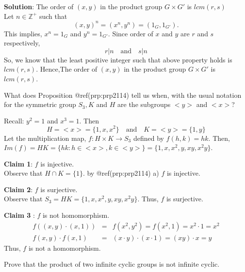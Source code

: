 \documentclass[
]{book}
\begin{document}
\textbf{Solution}: The order of \((x, y)\) in the product group
\(G \times G'\) is \(lcm(r,s)\)\\
Let \(n\in \mathbb{Z}^+\) such that \[(x,y)^n=(x^n,y^n)=(1_G,1_{G'}).\]
This implies, \(x^n=1_G\) and \(y^n=1_{G'}\). Since order of \(x\) and
\(y\) are \(r\) and \(s\) respectively, \[r|n~~~\text{ and }~~~s|n\] So,
we know that the least positive integer such that above property holds
is \(lcm(r,s)\). Hence,The order of \((x, y)\) in the product group
\(G \times G'\) is \(lcm(r,s)\).

\leavevmode{}%
What does Proposition @ref(prp:prp2114) tell us when, with the usual
notation for the symmetric group \(S_3,K\) and \(H\) are the subgroups
\(<y>\) and \(<x>\)?

Recall: \(y^2=1\) and \(x^3=1\). Then
\[H=<x>=\{1,x,x^2\}~~~\text{ and }~~~ K=<y>=\{1,y\}\] Let the
multiplication map, \(f:H\times K \to S_3\) defined by \(f(h,k)=hk\).
Then, \(Im(f)=HK=\{hk:h\in <x>, k\in <y>\}=\{1,x,x^2,y,xy,x^2y\}\).

\textbf{Claim 1}: \(f\) is injective.\\
Observe that \(H \cap K=\{1\}\). by @ref(prp:prp2114) a) \(f\) is
injective.

\textbf{Claim 2}: \(f\) is surjective.\\
Observe that \(S_3=HK=\{1,x,x^2,y,xy,x^2y\}\). Thus, \(f\) is
surjective.

\textbf{Claim 3} : \(f\) is not homomorphism.\\
\begin{eqnarray}
f((x,y)\cdot (x,1))&=& f(x^2,y^2)=f(x^2,1)=x^2\cdot 1=x^2\\
f(x,y)\cdot f(x,1)&=& (x\cdot y)\cdot (x\cdot 1)=(xy)\cdot x=y
\end{eqnarray} Thus, \(f\) is not a homomorphism.

\leavevmode{}%
Prove that the product of two infinite cyclic groups is not infinite
cyclic.
\end{document}
